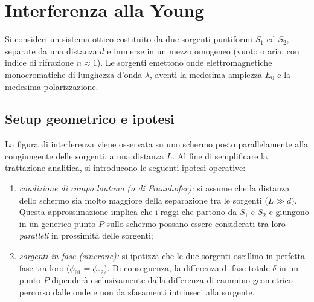 \documentclass[a4paper,11pt]{report}
\begin{document}
\section{Interferenza alla Young}

Si consideri un sistema ottico costituito da due sorgenti puntiformi $S_1$ ed $S_2$, separate da una distanza $d$ e immerse in un mezzo omogeneo (vuoto o aria, con indice di rifrazione $n \approx 1$).
Le sorgenti emettono onde elettromagnetiche monocromatiche di lunghezza d'onda $\lambda$, aventi la medesima ampiezza $E_0$ e la medesima polarizzazione.

\subsection{Setup geometrico e ipotesi}
La figura di interferenza viene osservata su uno schermo posto parallelamente alla congiungente delle sorgenti, a una distanza $L$. Al fine di semplificare la trattazione analitica, si introducono le seguenti ipotesi operative:

\begin{enumerate}
    \item \textit{condizione di campo lontano (o di Fraunhofer):} si assume che la distanza dello schermo sia molto maggiore della separazione tra le sorgenti ($L \gg d$). Questa approssimazione implica che i raggi che partono da $S_1$ e $S_2$ e giungono in un generico punto $P$ sullo schermo possano essere considerati tra loro \textit{paralleli} in prossimità delle sorgenti;
    \item \textit{sorgenti in fase (sincrone):} si ipotizza che le due sorgenti oscillino in perfetta fase tra loro ($\phi_{01} = \phi_{02}$). Di conseguenza, la differenza di fase totale $\delta$ in un punto $P$ dipenderà esclusivamente dalla differenza di cammino geometrico percorso dalle onde e non da sfasamenti intrinseci alla sorgente.
\end{enumerate}
\end{document}
